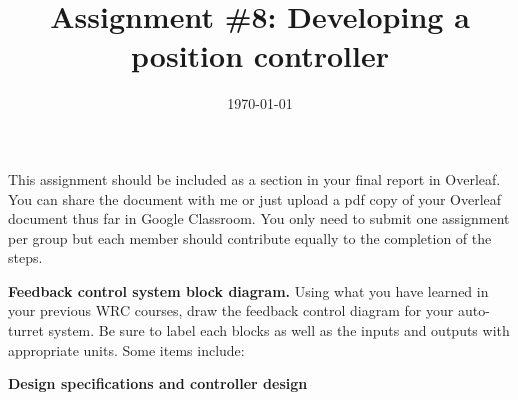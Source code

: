 \documentclass[noanswers]{exam}
\title{Assignment \#8: Developing a position controller}
\author{\usnaAuthorShort}
\date{\today}
\begin{document}
\maketitle

This assignment should be included as a section in your final report in Overleaf.  You can share the document with me or just upload a pdf copy of your Overleaf document thus far in Google Classroom. You only need to submit one assignment per group but each member should contribute equally to the completion of the steps.  

\begin{questions}
\question \textbf{Feedback control system block diagram.} Using what you have learned in your previous WRC courses, draw the feedback control diagram for your auto-turret system.  Be sure to label each blocks as well as the inputs and outputs with appropriate units.  Some items include:

\question \textbf{Design specifications and controller design}
\end{questions}
\end{document}
